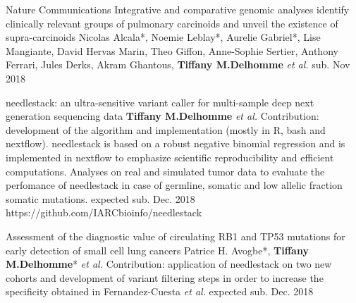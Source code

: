 \begin{cventries}
	\cvpublicationentry
    {Nature Communications} %
    {Integrative and comparative genomic analyses identify clinically relevant groups of pulmonary carcinoids and unveil the existence of supra-carcinoids} %
    {Nicolas Alcala*, Noemie Leblay*, Aurelie Gabriel*, Lise Mangiante, David Hervas Marin, Theo Giffon, Anne-Sophie Sertier, Anthony Ferrari, Jules
Derks, Akram Ghantous, \textbf{Tiffany M.Delhomme} \textit{et al.}} %
    {}
    {sub. Nov 2018} %
    {}


	\cvpublicationentry
    {} %
    {needlestack: an ultra-sensitive variant caller for multi-sample deep next generation sequencing data} %
    {\textbf{Tiffany M.Delhomme} \textit{et al.}} %
    {Contribution: development of the algorithm and implementation (mostly in R, bash and nextflow). needlestack is based on a robust negative binomial regression and is implemented in nextflow to emphasize scientific reproducibility and efficient computations. Analyses on real and simulated tumor data to evaluate the perfomance of needlestack in case of germline, somatic and low allelic fraction somatic mutations.}
    {expected sub. Dec. 2018} %
    {https://github.com/IARCbioinfo/needlestack}
    
    \cvpublicationentry
    {} %
    {Assessment of the diagnostic value of circulating RB1 and
TP53 mutations for early detection of small cell lung cancers} %
    {Patrice H. Avogbe*, \textbf{Tiffany M.Delhomme}* \textit{et al.}} %
    {Contribution: application of needlestack on two new cohorts and development of variant filtering steps in order to increase the specificity obtained in Fernandez-Cuesta \textit{et al.}}
    {expected sub. Dec. 2018} %
    {}
\end{cventries}
